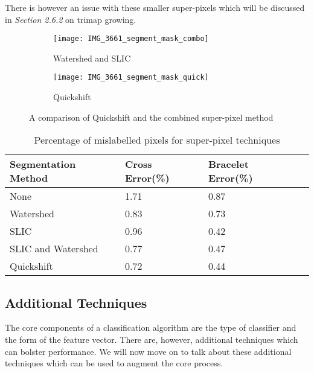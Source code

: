 \documentclass[12pt]{IIBproject}
\begin{document}
There is however an issue with these smaller super-pixels which will be discussed in \emph{Section 2.6.2} on trimap growing.

\begin{figure}[H]
\centering
\begin{subfigure}{.45\textwidth}
  \centering
  \texttt{[image: IMG\_3661\_segment\_mask\_combo]}
  \caption{Watershed and SLIC}
  \label{fig:sub2}
\end{subfigure}
\begin{subfigure}{.45\textwidth}
  \centering
  \texttt{[image: IMG\_3661\_segment\_mask\_quick]}
  \caption{Quickshift}
  \label{fig:sub1}
\end{subfigure}%


\caption{A comparison of Quickshift and the combined super-pixel method}
\label{fig:test}
\end{figure}








\begin{table}[H]
\begin{center}
    \begin{tabular}{ | l | l | l | p{5cm} |}
    \hline
    Segmentation Method & Cross Error(\%) & Bracelet Error(\%) \\ \hline
    None & 1.71 & 0.87 \\ \hline
    Watershed & 0.83 & 0.73 \\ \hline
    SLIC & 0.96 & 0.42 \\ \hline
    SLIC and Watershed & 0.77 & 0.47 \\ \hline
    Quickshift & 0.72 & 0.44 \\
    \hline
     
    \end{tabular}
    \caption{Percentage of mislabelled pixels for super-pixel techniques}\label{table:somename}
\end{center}
\end{table}
\subsection{Additional Techniques}
The core components of a classification algorithm are the type of classifier and the form of the feature vector. There are, however, additional techniques which can bolster performance. We will now move on to talk about these additional techniques which can be used to augment the core process.
\end{document}
